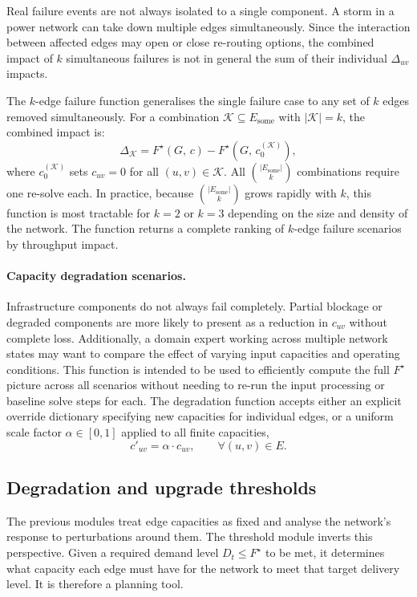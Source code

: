 \documentclass[12pt]{report}
\begin{document}
Real failure events are not always isolated to a single component. A storm in a power network can take down multiple edges simultaneously. Since the interaction between affected edges may open or close re-routing options, the combined impact of $k$ simultaneous failures is not in general the sum of their individual $\Delta_{uv}$ impacts.

The $k$-edge failure function generalises the single failure case to any set of $k$ edges removed simultaneously. For a combination $\mathcal{K} \subseteq E_{\text{some}}$ with $|\mathcal{K}| = k$, the combined impact is:
\[
\Delta_{\mathcal{K}} = F^\star(G,\, c) - 
F^\star\!\left(G,\, c^{(\mathcal{K})}_0\right),
\]
where $c^{(\mathcal{K})}_0$ sets $c_{uv} = 0$ for all $(u,v) \in \mathcal{K}$. 
All $\binom{|E_{\text{some}}|}{k}$ combinations require one re-solve each. In practice, because $\binom{|E_{\text{some}}|}{k}$ grows rapidly with $k$, this function is most tractable for $k = 2$ or $k = 3$ depending on the size and density of the network. The function returns a complete ranking of $k$-edge failure scenarios by throughput impact.

\paragraph{Capacity degradation scenarios.}
Infrastructure components do not always fail completely. Partial blockage or degraded components are more likely to present as a 
reduction in $c_{uv}$ without complete loss. Additionally, a domain expert working across multiple network states may want to compare the effect of varying input capacities and operating conditions. This function is intended to be used to efficiently compute the full $F^\star$ picture across all scenarios without needing to re-run the input processing or baseline solve steps for each.
The degradation function accepts either an explicit override dictionary specifying new capacities for individual edges, or a uniform scale factor 
$\alpha \in [0,1]$ applied to all finite capacities,
\[
c'_{uv} = \alpha \cdot c_{uv}, \qquad \forall (u,v) \in E.
\]





\subsection{Degradation and upgrade thresholds}
\label{sec:flow-parametric}

The previous modules treat edge capacities as fixed and analyse the network's response to perturbations around them. The threshold module inverts this perspective. Given a required demand level $D_t \leq F^\star$ to be met, it determines what capacity each edge must have for the network to meet that target delivery level. It is therefore a planning tool.
\end{document}
